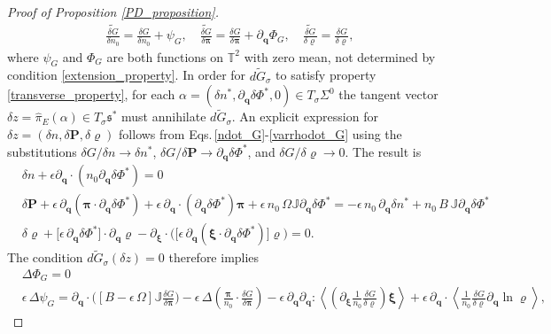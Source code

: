 \documentclass[10pt,a4paper]{amsart}
\begin{document}
\begin{proof}[Proof of Proposition \ref{PD_proposition}]
\begin{align*}
\widetilde{\frac{\delta G}{\delta n_0}}  = \frac{\delta G}{\delta n_0} + \psi_G,\quad \widetilde{\frac{\delta G}{\delta\bm{\pi}}}  = \frac{\delta G}{\delta\bm{\pi}} + \partial_{\bm{q}}\Phi_G,\quad \widetilde{\frac{\delta G}{\delta\varrho}}  = \frac{\delta G}{\delta \varrho},
\end{align*}
where $\psi_G$ and $\Phi_G$ are both functions on $\mathbb{T}^2$ with zero mean, not determined by condition \eqref{extension_property}. In order for $\widetilde{dG_\sigma}$ to satisfy property \eqref{transverse_property}, for each $\alpha = (\delta n^*,\partial_{\bm{q}}\delta\Phi^*,0)\in T_\sigma\Sigma^0$ the tangent vector $\delta z = \widehat{\pi}_E(\alpha)\in T_\sigma\mathfrak{s}^*$ must annihilate $\widetilde{dG_\sigma}$. An explicit expression for $\delta z = (\delta n,\delta\bm{P},\delta\varrho)$ follows from Eqs.\,\eqref{ndot_G}-\eqref{varrhodot_G} using the substitutions $\delta G/\delta n\rightarrow \delta n^*$, $\delta G/\delta \bm{P}\rightarrow \partial_{\bm{q}}\delta \Phi^*$, and $\delta G/\delta\varrho\rightarrow 0$. The result is
\begin{align}
&\delta n +\epsilon\partial_{\bm{q}}\cdot\left(n_0\partial_{\bm{q}}\delta\Phi^*\right) = 0 \label{delta_n_biv}\\
&\delta\bm{P} + \epsilon\,\partial_{\bm{q}}\left( {\bm{\pi}}\cdot \partial_{\bm{q}}\delta\Phi^*\right) + \epsilon\,\partial_{\bm{q}}\cdot\left(\partial_{\bm{q}}\delta\Phi^*\right){\bm{\pi}} + \epsilon\,n_0\,\Omega\mathbb{J}\partial_{\bm{q}}\delta\Phi^* = - \epsilon\,n_0\,\partial_{\bm{q}}\delta n^* + n_0\,B\,\mathbb{J}\partial_{\bm{q}}\delta\Phi^* \label{delta_P_biv}\\
&\delta\varrho + \bigg[\epsilon\,\partial_{\bm{q}}\delta\Phi^* \bigg]\cdot\partial_{\bm{q}}\varrho- \partial_{\bm{\xi}}\cdot\bigg(\bigg[\epsilon\,\partial_{\bm{q}}\left(\bm{\xi}\cdot\partial_{\bm{q}}\delta\Phi^*\right)\bigg]\varrho\bigg) = 0.\label{delta_varrho_biv}
\end{align}
The condition $\widetilde{dG_\sigma}(\delta z) = 0$ therefore implies
\begin{align*}
&\Delta \Phi_G = 0\\
&\epsilon\,\Delta \psi_G = \partial_{\bm{q}}\cdot\bigg([B -\epsilon\,\Omega]\mathbb{J}\frac{\delta G}{\delta\bm{\pi}}\bigg) - \epsilon\,\Delta\left(\frac{\bm{\pi}}{n_0}\cdot \frac{\delta G}{\delta\bm{\pi}}\right) - \epsilon\,\partial_{\bm{q}}\partial_{\bm{q}}:\left\langle\left(\partial_{\bm{\xi}}\frac{1}{n_0}\frac{\delta G}{\delta \varrho}\right)\bm{\xi}\right\rangle + \epsilon\,\partial_{\bm{q}}\cdot\left\langle \frac{1}{n_0}\frac{\delta G}{\delta \varrho}\partial_{\bm{q}}\ln\varrho\right\rangle,

\end{align*}
\end{proof}
\end{document}
